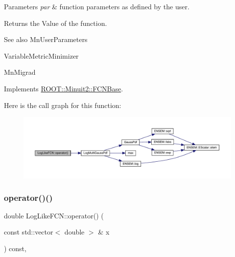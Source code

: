 \begin{DoxyParams}{Parameters}
{\em par} & function parameters as defined by the user.\\
\hline
\end{DoxyParams}
\begin{DoxyReturn}{Returns}
the Value of the function.
\end{DoxyReturn}
\begin{DoxySeeAlso}{See also}
Mn\+User\+Parameters 

Variable\+Metric\+Minimizer 

Mn\+Migrad 
\end{DoxySeeAlso}


Implements \mbox{\hyperlink{classROOT_1_1Minuit2_1_1FCNBase_ae4a86bd94d0d0f5ca6fc8f8ab2bb43cd}{R\+O\+O\+T\+::\+Minuit2\+::\+F\+C\+N\+Base}}.

Here is the call graph for this function\+:
\nopagebreak
\begin{figure}[H]
\begin{center}
\leavevmode
\includegraphics[width=350pt]{d2/d8c/structLogLikeFCN_a22d42d405147ecea23ab7b3a61003179_cgraph}
\end{center}
\end{figure}
\mbox{\label{structLogLikeFCN_a22d42d405147ecea23ab7b3a61003179}} 
\subsubsection{\texorpdfstring{operator()()}{operator()()}\hspace{0.1cm}{\footnotesize\ttfamily [2/2]}}
{\footnotesize\ttfamily double Log\+Like\+F\+C\+N\+::operator() (\begin{DoxyParamCaption}\item[{const std\+::vector$<$ double $>$ \&}]{x }\end{DoxyParamCaption}) const\hspace{0.3cm}{\ttfamily [inline]}, {\ttfamily [virtual]}}

